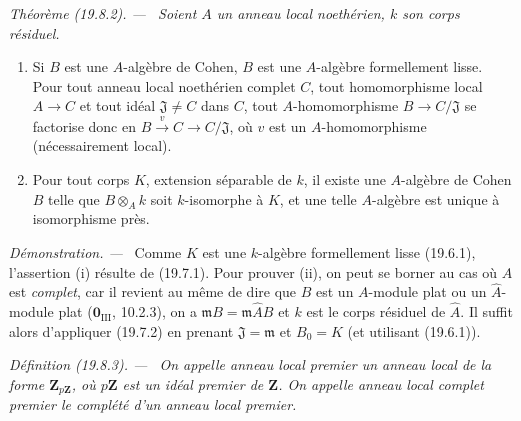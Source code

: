 \documentclass[10pt,oneside]{book}
\makeatletter
\newcommand{\setmanualcurrentlabel}[1]{\def\@currentlabel{#1}}
\newcommand{\oldpage}[2][]{%
  \setcounter{footnote}{0}%
  \marginpar{\scriptsize\textbf{#1}~|~#2}\ignorespaces}
\newenvironment{definition}[1][]{%
  \setmanualcurrentlabel{#1}\par\medskip\noindent\itshape Définition (#1). ---\ }{\par}
\newenvironment{theorem}[1][]{%
  \setmanualcurrentlabel{#1}\par\medskip\noindent\itshape Théorème (#1). ---\ }{\par}
\newenvironment{proof}{%
  \par\medskip\noindent\textit{Démonstration. ---\ }}{\par}
\makeatother
\begin{document}
\oldpage[0\textsubscript{IV-1}]{110}

\begin{theorem}[19.8.2]
\label{0.19.8.2-fr}
Soient $A$ un anneau local noethérien, $k$ son corps résiduel.
\begin{enumerate}
  \item[(i)] Si $B$ est une $A$-algèbre de Cohen, $B$ est une $A$-algèbre
  formellement lisse. Pour tout anneau local noethérien complet $C$, tout
  homomorphisme local $A\to C$ et tout idéal $\mathfrak J\neq C$ dans $C$,
  tout $A$-homomorphisme $B\to C/\mathfrak J$ se factorise donc en
  $B\xrightarrow{v}C\to C/\mathfrak J$, où $v$ est un $A$-homomorphisme
  (nécessairement local).
  \item[(ii)] Pour tout corps $K$, extension séparable de $k$, il existe une
  $A$-algèbre de Cohen $B$ telle que $B\otimes_A k$ soit $k$-isomorphe à $K$,
  et une telle $A$-algèbre est unique à isomorphisme près.
\end{enumerate}
\end{theorem}

\begin{proof}
Comme $K$ est une $k$-algèbre formellement lisse (19.6.1), l'assertion (i)
résulte de (19.7.1). Pour prouver (ii), on peut se borner au cas où $A$ est
\emph{complet}, car il revient au même de dire que $B$ est un $A$-module plat
ou un $\widehat A$-module plat ($\mathbf 0_{\mathrm{III}}$, 10.2.3), on a
$\mathfrak mB=\mathfrak m\widehat AB$ et $k$ est le corps résiduel de
$\widehat A$. Il suffit alors d'appliquer (19.7.2) en prenant
$\mathfrak J=\mathfrak m$ et $B_0=K$ (et utilisant (19.6.1)).
\end{proof}

\begin{definition}[19.8.3]
\label{0.19.8.3-fr}
On appelle \emph{anneau local premier} un anneau local de la forme
$\mathbf Z_{p\mathbf Z}$, où $p\mathbf Z$ est un idéal premier de $\mathbf Z$.
On appelle \emph{anneau local complet premier} le complété d'un anneau local
premier.
\end{definition}
\end{document}
